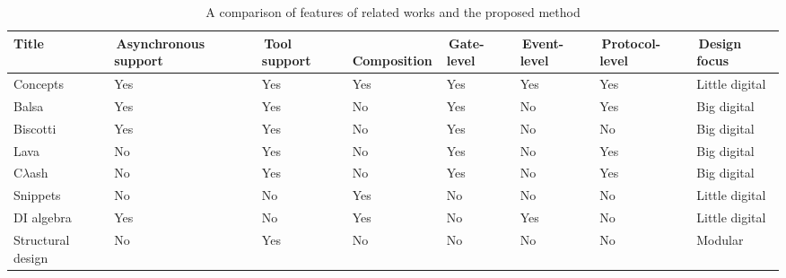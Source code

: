 \documentclass[british, journal]{IEEEtran}
\begin{document}
\begin{table*}[t]
\caption{A comparison of features of related works and the proposed method \label{tab:related_work}}
  \centering
  \begin{tabular}[htb]{| m{2.6cm} | m{2.0cm} | m{1.3cm} | m{1.75cm} | m{1.5cm} | m{1.5cm} | m{1.7cm} | m{1.9cm} |}
  \hline
  Title             & \,Asynchronous support & \,Tool support  & \,Composition & \,Gate-level & \,Event-level & \,Protocol-level  & \,Design focus \\ \hline \hline
  Concepts            & Yes                               & Yes                  & Yes               & Yes                       & Yes                         & Yes                              & Little digital \\ \hline
  Balsa             & Yes                               & Yes                  & No                & Yes                       & No                          & Yes                              & Big digital \\ \hline
  Biscotti            & Yes                               & Yes                  & No                & Yes                       & No                          & No                               & Big digital \\ \hline
  Lava              & No                               & Yes                  & No                & Yes                       & No                          & Yes                              & Big digital \\ \hline
  C$\lambda$ash     & No                               & Yes                  & No                & Yes                       & No                          & Yes                              & Big digital \\ \hline
  Snippets          & No                                & No                   & Yes               & No                        & No                          & No                               & Little digital \\ \hline
  DI algebra        & Yes                               & No                   & Yes               & No                        & Yes                         & No                               & Little digital \\ \hline
  Structural design & No                                & Yes                  & No                & No                        & No                          & No                               & Modular \\ \hline
  \end{tabular}
  \vspace{-3mm}
\end{table*}
\end{document}
